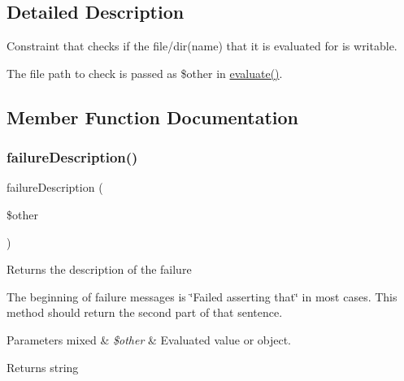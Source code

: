 \subsection{Detailed Description}
Constraint that checks if the file/dir(name) that it is evaluated for is writable.

The file path to check is passed as \$other in \mbox{\hyperlink{class_p_h_p_unit___framework___constraint_a4c184790087f7d42c3daf0d0180fe5fb}{evaluate()}}. 

\subsection{Member Function Documentation}
\mbox{\label{class_p_h_p_unit___framework___constraint___is_writable_aaabb679273bfb812df4d81c283754a59}} 
\subsubsection{\texorpdfstring{failure\+Description()}{failureDescription()}}
{\footnotesize\ttfamily failure\+Description (\begin{DoxyParamCaption}\item[{}]{\$other }\end{DoxyParamCaption})\hspace{0.3cm}{\ttfamily [protected]}}

Returns the description of the failure

The beginning of failure messages is \char`\"{}\+Failed asserting that\char`\"{} in most cases. This method should return the second part of that sentence.


\begin{DoxyParams}[1]{Parameters}
mixed & {\em \$other} & Evaluated value or object.\\
\hline
\end{DoxyParams}
\begin{DoxyReturn}{Returns}
string 
\end{DoxyReturn}
\mbox{\label{class_p_h_p_unit___framework___constraint___is_writable_a9c9c337de483bbdbb9fa249a6c7c9cc5}} 
